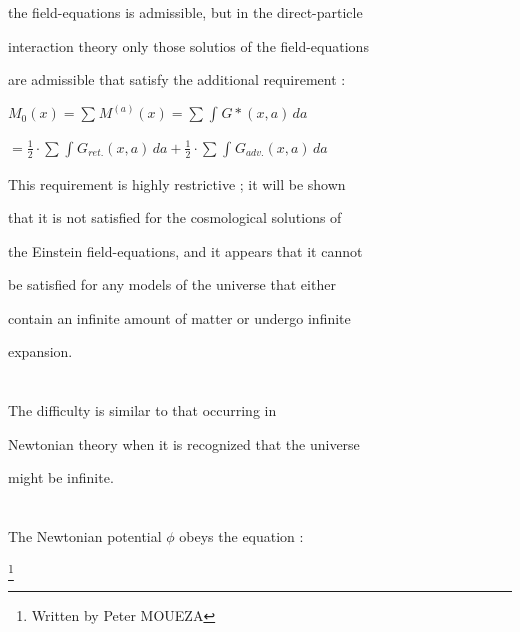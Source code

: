 \documentclass{article}
\date{1st february 1966}
\begin{document}





\section{}
the field-equations is admissible, but in the direct-particle

interaction theory only those solutios of the field-equations

are admissible that satisfy the additional requirement :
 
$M_0(x) = \sum_{}^{} M^{(a)}(x) =  \sum_{}^{}  \int_{}^{}  G*(x,a)  \,da $


$ = \frac{1}{2}  \cdot \sum_{}^{}  \int_{}^{}  G_{ret.}(x,a)  \,da + \frac{1}{2}  \cdot \sum_{}^{}  \int_{}^{}  G_{adv.}(x,a)  \,da$




This requirement is highly restrictive ; it will be shown

that it is not satisfied for the cosmological solutions of

the Einstein field-equations, and it appears that it cannot

be satisfied for any models of the universe that either

contain an infinite amount of matter or undergo infinite

expansion.






\section{}The difficulty is similar to that occurring in

  Newtonian theory when it is recognized that the universe

  might be infinite.

  \section{}
  The Newtonian potential $\phi$ obeys the equation :



\footnote{Written by Peter MOUEZA}
\end{document}
